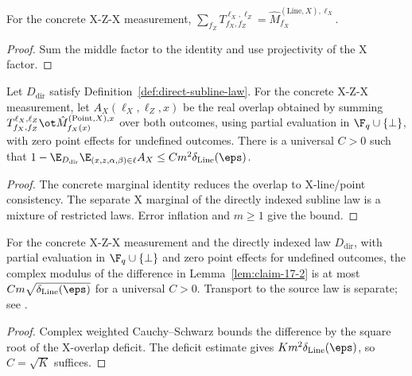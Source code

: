 \begin{lemma}
	\label{lem:concrete-line-X-marginal}
	\leanok
	For the concrete X-Z-X measurement,
	$\sum_{f_Z}T^{\ell_X,\ell_Z}_{f_X,f_Z}
	=\hat M^{(\mathrm{Line},X),\ell_X}_{f_X}$.
\end{lemma}
\begin{proof}
	\leanok
	Sum the middle factor to the identity and use projectivity of the X factor.
\end{proof}

\begin{lemma}
	\label{lem:concrete-X-deficit-direct}
	\leanok
	Let $D_{\mathrm{dir}}$ satisfy Definition~\ref{def:direct-subline-law}.
	For the concrete X-Z-X measurement, let
	$A_X(\ell_X,\ell_Z,x)$ be the real overlap obtained by summing
	$T_{f_X,f_Z}^{\ell_X,\ell_Z}\ot
	\hat M^{(\mathrm{Point},X),x}_{f_X(x)}$ over both outcomes, using
	partial evaluation in $\F_q \cup \{\bot\}$, with zero point effects for
	undefined outcomes. There is a universal $C>0$ such that
	$1-\E_{D_{\mathrm{dir}}}\E_{(x,z,\alpha,\beta)\in\ell} A_X
	\le C m^2\delta_{\mathrm{Line}}(\eps)$.
\end{lemma}
\begin{proof}
	\leanok
	The concrete marginal identity reduces the overlap to X-line/point
	consistency. The separate X marginal of the directly indexed subline law
	is a mixture of restricted laws. Error inflation and $m\ge1$ give the bound.
\end{proof}

\begin{lemma}
	\label{lem:claim-17-2-direct}
	\leanok
	For the concrete X-Z-X measurement and the directly indexed law
	$D_{\mathrm{dir}}$, with partial evaluation in $\F_q \cup \{\bot\}$ and
	zero point effects for undefined outcomes, the complex
	modulus of the difference in Lemma~\ref{lem:claim-17-2} is at most
	$C m\sqrt{\delta_{\mathrm{Line}}(\eps)}$ for a universal $C>0$.
	Transport to the source law is separate; see
	\cite{gap:qpbt_subline-claims-line-marginal,gap:qpbt_ld-dimension-divisibility}.
\end{lemma}
\begin{proof}
	\leanok
	Complex weighted Cauchy--Schwarz bounds the difference by the square root
	of the X-overlap deficit. The deficit estimate gives $K m^2
	\delta_{\mathrm{Line}}(\eps)$, so $C=\sqrt K$ suffices.
\end{proof}

